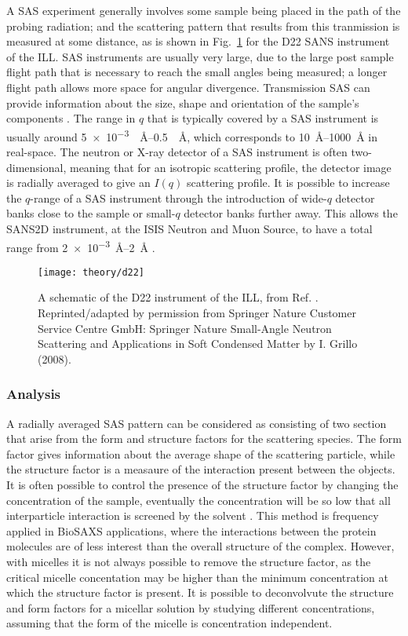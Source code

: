 A SAS experiment generally involves some sample being placed in the path of the probing radiation; and the scattering pattern that results from this tranmission is measured at some distance, as is shown in Fig.~\ref{fig:sasgeo} for the D22 SANS instrument of the ILL.
SAS instruments are usually very large, due to the large post sample flight path that is necessary to reach the small angles being measured; a longer flight path allows more space for angular divergence.
Transmission SAS can provide information about the size, shape and orientation of the sample's components \cite{Willis2009}.
The range in $q$ that is typically covered by a SAS instrument is usually around \SIrange{5e-3}{0.5}{\per\angstrom}, which corresponds to \SIrange{10}{1000}{\angstrom} in real-space. The neutron or X-ray detector of a SAS instrument is often two-dimensional, meaning that for an isotropic scattering profile, the detector image is radially averaged to give an $I(q)$ scattering profile.
It is possible to increase the $q$-range of a SAS instrument through the introduction of wide-$q$ detector banks close to the sample or small-$q$ detector banks further away.
This allows the SANS2D instrument, at the ISIS Neutron and Muon Source, to have a total range from \SIrange{2e-3}{2}{\angstrom} \cite{sans2d2016}.
%
\begin{figure}
	\centering
	\texttt{[image: theory/d22]}
	\caption{A schematic of the D22 instrument of the ILL, from Ref. \cite{Grillo2008}. Reprinted/adapted by permission from Springer Nature Customer Service Centre GmbH: Springer Nature Small-Angle Neutron Scattering and Applications in Soft Condensed Matter by I. Grillo\textsuperscript{\textcopyright} (2008).}
	\label{fig:sasgeo}
\end{figure}
%

\subsubsection{Analysis}

A radially averaged SAS pattern can be considered as consisting of two section that arise from the form and structure factors for the scattering species.
The form factor gives information about the average shape of the scattering particle, while the structure factor is a measaure of the interaction present between the objects.
It is often possible to control the presence of the structure factor by changing the concentration of the sample, eventually the concentration will be so low that all interparticle interaction is screened by the solvent \cite{Edler2015}.
This method is frequency applied in BioSAXS applications, where the interactions between the protein molecules are of less interest than the overall structure of the complex.
However, with micelles it is not always possible to remove the structure factor, as the critical micelle concentation may be higher than the minimum concentration at which the structure factor is present.
It is possible to deconvolvute the structure and form factors for a micellar solution by studying different concentrations, assuming that the form of the micelle is concentration independent.

